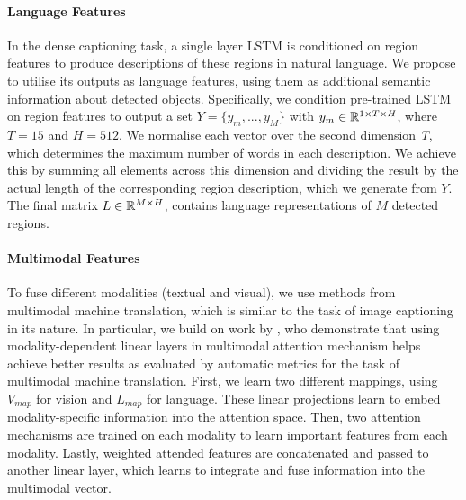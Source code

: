 \documentclass[11pt,a4paper]{article}
\newcommand{\kibitz}[2]{\ifnum\Comments=1\textcolor{#1}{#2}\fi}
\newcommand{\nikolai}[1]{\kibitz{red}      {[Nikolai: #1]}}
\newcommand{\R}{\mathbb{R}}
\begin{document}
\paragraph{Language Features}
In the dense captioning task, a single layer LSTM is conditioned on region features to produce descriptions of these regions in natural language.
We propose to utilise its outputs as language features, using them as additional semantic information about detected objects.
Specifically, we condition pre-trained LSTM on region features to output a set ${Y = \{y_m, ..., y_M\}}$ with $y_m \in \R\sp{1 \times T \times H}$, where $T=15$ and $H=512$.
We normalise each vector over the second dimension \textit{T}, which determines the maximum number of words in each description.
We achieve this by summing all elements across this dimension and dividing the result by the actual length of the corresponding region description, which we generate from $Y$.
The final matrix $L \in \R\sp{M \times H}$, contains language representations of $M$ detected regions.


\paragraph{Multimodal Features}
To fuse different modalities (textual and visual), we use methods from multimodal machine translation, which is similar to the task of image captioning in its nature.
In particular, we build on work by , who demonstrate that using modality-dependent linear layers in multimodal attention mechanism helps achieve better results as evaluated by automatic metrics for the task of multimodal machine translation.
First, we learn two different mappings, using $V_{map}$ for vision and $L_{map}$ for language.
These linear projections learn to embed modality-specific information into the attention space.
Then, two attention mechanisms are trained on each modality to learn important features from each modality.
Lastly, weighted attended features are concatenated and passed to another linear layer, which learns to integrate and fuse information into the multimodal vector.
\end{document}
